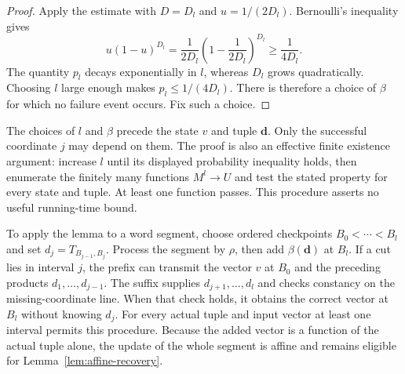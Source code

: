 \begin{proof}
Apply the estimate with $D=D_l$ and $u=1/(2D_l)$. Bernoulli's
inequality gives
\[
 u(1-u)^{D_l}
 =\frac1{2D_l}\left(1-\frac1{2D_l}\right)^{D_l}
 \ge\frac1{4D_l}.
\]
The quantity $p_l$ decays exponentially in $l$, whereas $D_l$ grows
quadratically. Choosing $l$ large enough makes $p_l\le1/(4D_l)$.
There is therefore a choice of $\beta$ for which no failure event
occurs. Fix such a choice.
\end{proof}

\begin{remark}\label{rem:finite-affine-choice}
The choices of $l$ and $\beta$ precede the state $v$ and tuple $\mathbf d$.
Only the successful coordinate $j$ may depend on them. The proof is also
an effective finite existence argument: increase $l$ until its displayed
probability inequality holds, then enumerate the finitely many functions
$M^l\to U$ and test the stated property for every state and tuple. At least
one function passes. This procedure asserts no useful running-time bound.
\end{remark}

To apply the lemma to a word segment, choose ordered checkpoints
$B_0<\cdots<B_l$ and set $d_j=T_{B_{j-1},B_j}$.
Process the segment by $\rho$, then add $\beta(\mathbf d)$ at $B_l$.
If a cut lies in interval $j$, the prefix can transmit the vector
$v$ at $B_0$ and the preceding products $d_1,\ldots,d_{j-1}$.
The suffix supplies $d_{j+1},\ldots,d_l$ and checks constancy on the
missing-coordinate line. When that check holds, it obtains the
correct vector at $B_l$ without knowing $d_j$. For every actual
tuple and input vector at least one interval permits this procedure.
Because the added vector is a function of the actual tuple alone,
the update of the whole segment is affine and remains eligible for
Lemma~\ref{lem:affine-recovery}.
